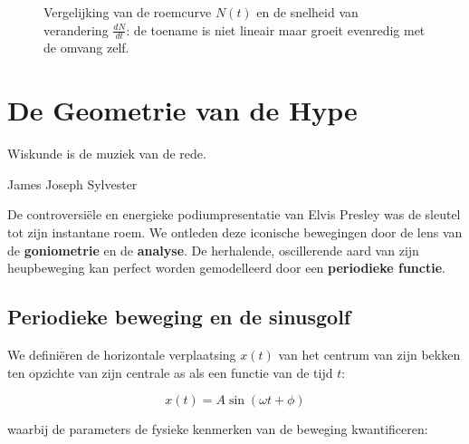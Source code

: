 \documentclass{book}
\begin{document}
	\begin{figure}[h!]
		\centering
		\caption{Vergelijking van de roemcurve $N(t)$ en de snelheid van verandering $\frac{dN}{dt}$: de toename is niet lineair maar groeit evenredig met de omvang zelf.}
		\label{fig:exponential_fame}
	\end{figure}
	
	\chapter{De Geometrie van de Hype}
	\label{chap:trigonometrie}
	
	\epigraph{Wiskunde is de muziek van de rede.}{James Joseph Sylvester}
	
	De controversi\"ele en energieke podiumpresentatie van Elvis Presley was de sleutel tot zijn instantane roem. 
	We ontleden deze iconische bewegingen door de lens van de \textbf{goniometrie} en de \textbf{analyse}. 
	De herhalende, oscillerende aard van zijn heupbeweging kan perfect worden gemodelleerd door een 
	\textbf{periodieke functie}.
	
	\section{Periodieke beweging en de sinusgolf}
	
	We defini\"eren de horizontale verplaatsing $x(t)$ van het centrum van zijn bekken 
	ten opzichte van zijn centrale as als een functie van de tijd $t$:
	
	\[
	x(t) = A \sin(\omega t + \phi)
	\]
	
	\noindent waarbij de parameters de fysieke kenmerken van de beweging kwantificeren:
	
\end{document}
